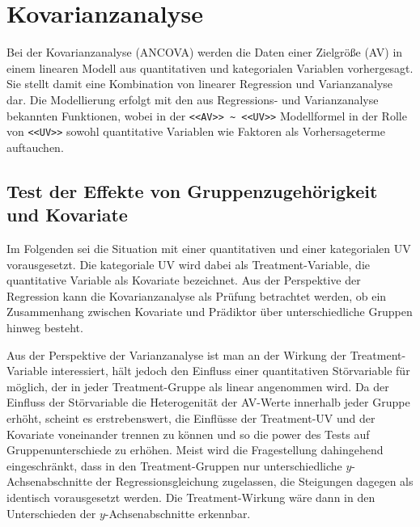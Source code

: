 \section{Kovarianzanalyse}
\label{sec:ancova}

Bei der Kovarianzanalyse (ANCOVA) werden die Daten einer Zielgröße (AV) in einem linearen Modell aus quantitativen und kategorialen Variablen vorhergesagt. Sie stellt damit eine Kombination von linearer Regression und Varianzanalyse dar. Die Modellierung erfolgt mit den aus Regressions- und Varianzanalyse bekannten Funktionen, wobei in der \lstinline!<<AV>> ~ <<UV>>! Modellformel in der Rolle von \lstinline!<<UV>>! sowohl quantitative Variablen wie Faktoren als Vorhersageterme auftauchen.

\subsection{Test der Effekte von Gruppenzugehörigkeit und Kovariate}
\label{sec:ancovaTest}

Im Folgenden sei die Situation mit einer quantitativen und einer kategorialen UV vorausgesetzt. Die kategoriale UV wird dabei als Treatment-Variable, die quantitative Variable als Kovariate bezeichnet. Aus der Perspektive der Regression kann die Kovarianzanalyse als Prüfung betrachtet werden, ob ein Zusammenhang zwischen Kovariate und Prädiktor über unterschiedliche Gruppen hinweg besteht.

Aus der Perspektive der Varianzanalyse ist man an der Wirkung der Treatment-Variable interessiert, hält jedoch den Einfluss einer quantitativen Störvariable für möglich, der in jeder Treatment-Gruppe als linear angenommen wird. Da der Einfluss der Störvariable die Heterogenität der AV-Werte innerhalb jeder Gruppe erhöht, scheint es erstrebenswert, die Einflüsse der Treatment-UV und der Kovariate voneinander trennen zu können und so die power des Tests auf Gruppenunterschiede zu erhöhen. Meist wird die Fragestellung dahingehend eingeschränkt, dass in den Treatment-Gruppen nur unterschiedliche $y$-Achsenabschnitte der Regressionsgleichung zugelassen, die Steigungen dagegen als identisch vorausgesetzt werden. Die Treatment-Wirkung wäre dann in den Unterschieden der $y$-Achsenabschnitte erkennbar.

